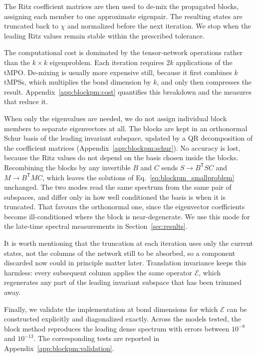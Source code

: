 The Ritz coefficient matrices are then used to de-mix the propagated blocks, assigning each member to one approximate eigenpair. The resulting states are truncated back to $\chi$ and normalized before the next iteration. We stop when the leading Ritz values remain stable within the prescribed tolerance.

The computational cost is dominated by the tensor-network operations rather than the $k\times k$ eigenproblem. Each iteration requires $2k$ applications of the \ac{tMPO}. De-mixing is usually more expensive still, because it first combines $k$ \acp{tMPS}, which multiplies the bond dimension by $k$, and only then compresses the result. Appendix~\ref{app:blockpm:cost} quantifies this breakdown and the measures that reduce it.

When only the eigenvalues are needed, we do not assign individual block members to separate eigenvectors at all. The blocks are kept in an orthonormal Schur basis of the leading invariant subspace, updated by a QR decomposition of the coefficient matrices (Appendix~\ref{app:blockpm:schur}). No accuracy is lost, because the Ritz values do not depend on the basis chosen inside the blocks. Recombining the blocks by any invertible $B$ and $C$ sends $S\to B^{\mathsf T}SC$ and $M\to B^{\mathsf T}MC$, which leaves the solutions of Eq.~\eqref{eq:blockpm_smallproblem} unchanged. The two modes read the same spectrum from the same pair of subspaces, and differ only in how well conditioned the basis is when it is truncated. That favours the orthonormal one, since the eigenvector coefficients become ill-conditioned where the block is near-degenerate. We use this mode for the late-time spectral measurements in Section~\ref{sec:results}.

It is worth mentioning that the truncation at each iteration uses only the current states, not the columns of the network still to be absorbed, so a component discarded now could in principle matter later. Translation invariance keeps this harmless: every subsequent column applies the same operator $\mathcal{E}$, which regenerates any part of the leading invariant subspace that has been trimmed away.

Finally, we validate the implementation at bond dimensions for which $\mathcal{E}$ can be constructed explicitly and diagonalized exactly. Across the models tested, the block method reproduces the leading dense spectrum with errors between $10^{-8}$ and $10^{-13}$. The corresponding tests are reported in Appendix~\ref{app:blockpm:validation}.

